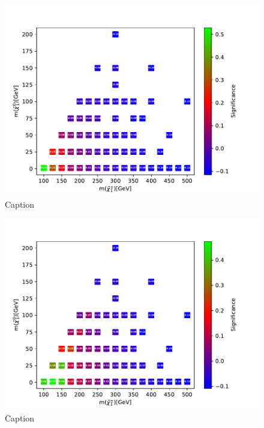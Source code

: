 \begin{figure}
    \centering
    \includegraphics[width = \textwidth]{Figures/Significances/significance_BDT_WW_Low_level.pdf}
    \caption{Caption}
    \label{fig:my_label}
\end{figure}


\begin{figure}
    \centering
    \includegraphics[width = \textwidth]{Figures/Significances/significance_BDT_WW_High_level.pdf}
    \caption{Caption}
    \label{fig:my_label}
\end{figure}



